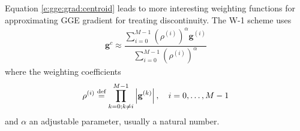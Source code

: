 \documentclass[11pt,dvips]{article}
\numberwithin{equation}{section}
\newcommand{\defeq}{\ensuremath{\buildrel {\text{def}}\over{=}}}
\begin{document}
Equation \ref{e:gge:grad:centroid} leads to more interesting weighting
functions for approximating GGE gradient for treating discontinuity.  The W-1
scheme uses
\begin{align}
  \mathbf{g}^{c} \approx \dfrac{
    \sum\limits_{i=0}^{M-1}\left(\rho^{(i)}\right)^{\alpha}\mathbf{g}^{(i)}
  }{
    \sum\limits_{i=0}^{M-1}\left(\rho^{(i)}\right)^{\alpha}
  }
\end{align}
where the weighting coefficients
\begin{align}
  \rho^{(i)} \defeq \prod_{k=0; k\neq i}^{M-1}
                    \left\vert\mathbf{g}^{(k)}\right\vert,
  \quad i = 0, \ldots, M-1
\end{align}
and $\alpha$ an adjustable parameter, usually a natural number.

\clearpage


\end{document}
